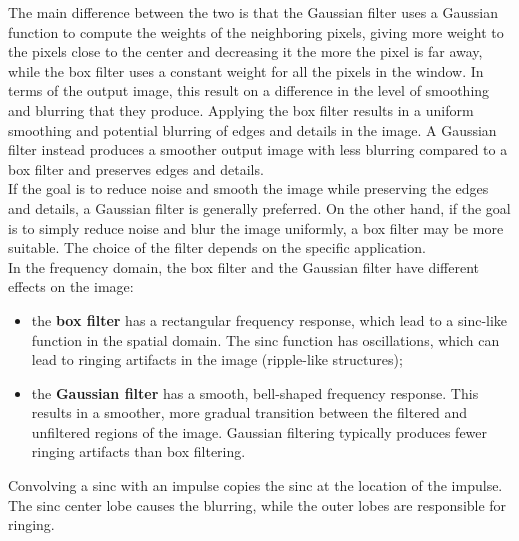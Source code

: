 \documentclass{article}
\begin{document}
The main difference between the two is that the Gaussian filter uses a Gaussian function to compute the weights of the neighboring pixels, giving more weight to the pixels close to the center and decreasing it the more the pixel is far away, while the box filter uses a constant weight for all the pixels in the window. In terms of the output image, this result on a difference in the level of smoothing and blurring that they produce. Applying the box filter results in a uniform smoothing and potential blurring of edges and details in the image. A Gaussian filter instead produces a smoother output image with less blurring compared to a box filter and preserves edges and details. \\

If the goal is to reduce noise and smooth the image while preserving the edges and details, a Gaussian filter is generally preferred. On the other hand, if the goal is to simply reduce noise and blur the image uniformly, a box filter may be more suitable. The choice of the filter depends on the specific application. \\

In the frequency domain, the box filter and the Gaussian filter have different effects on the image:
\begin{itemize}
    \item the \textbf{box filter} has a rectangular frequency response, which lead to a sinc-like function in the spatial domain. The sinc function has oscillations, which can lead to ringing artifacts in the image (ripple-like structures);
    \item the \textbf{Gaussian filter} has a smooth, bell-shaped frequency response. This results in a smoother, more gradual transition between the filtered and unfiltered regions of the image. Gaussian filtering typically produces fewer ringing artifacts than box filtering.
\end{itemize}

Convolving a sinc with an impulse copies the sinc at the location of the impulse. The sinc center lobe causes the blurring, while the outer lobes are responsible for ringing.

\hspace{0.5cm}

\begin{center}
    
    
\end{center}
\end{document}
